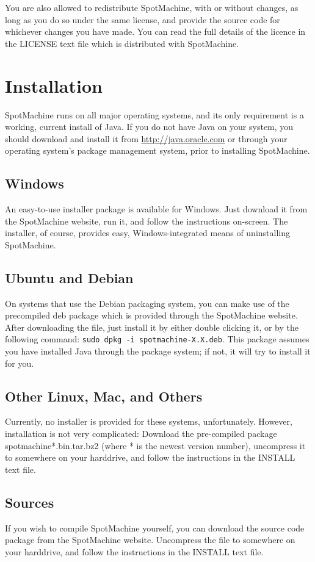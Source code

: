 \documentclass[a4paper,12pt]{report}
\begin{document}
You are also allowed to redistribute SpotMachine, with or without changes, as long as you do so under the same license, and provide the source code for whichever changes you have made. You can read the full details of the licence in the LICENSE text file which is distributed with SpotMachine.

\chapter{Installation}
SpotMachine runs on all major operating systems, and its only requirement is a working, current install of Java. If you do not have Java on your system, you should download and install it from \url{http://java.oracle.com} or through your operating system's package management system, prior to installing SpotMachine.

\section{Windows}
An easy-to-use installer package is available for Windows. Just download it from the SpotMachine website, run it, and follow the instructions on-screen. The installer, of course, provides easy, Windows-integrated means of uninstalling SpotMachine.

\section{Ubuntu and Debian}
On systems that use the Debian packaging system, you can make use of the precompiled deb package which is provided through the SpotMachine website. After downloading the file, just install it by either double clicking it, or by the following command: \texttt{sudo dpkg -i spotmachine-X.X.deb}. This package assumes you have installed Java through the package system; if not, it will try to install it for you.

\section{Other Linux, Mac, and Others}
Currently, no installer is provided for these systems, unfortunately. However, installation is not very complicated: Download the pre-compiled package spotmachine*.bin.tar.bz2 (where * is the newest version number), uncompress it to somewhere on your harddrive, and follow the instructions in the INSTALL text file.

\section{Sources}
If you wish to compile SpotMachine yourself, you can download the source code package from the SpotMachine website. Uncompress the file to somewhere on your harddrive, and follow the instructions in the INSTALL text file.
\end{document}
